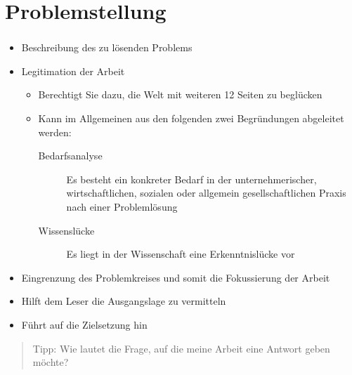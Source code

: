 \documentclass[aspectratio=169]{beamer}
\begin{document}
\section{Problemstellung}
\begin{frame}
  \frametitle{\insertsection}%
  \framesubtitle{\insertsubsection}%
  \begin{itemize}
   \item Beschreibung des zu lösenden Problems
   \item Legitimation der Arbeit
   \begin{itemize}
    \item Berechtigt Sie dazu, die Welt mit weiteren 12 Seiten zu beglücken
    \item Kann im Allgemeinen aus den folgenden zwei Begründungen abgeleitet werden:
    \begin{description}
     \item[Bedarfsanalyse] Es besteht ein konkreter Bedarf in der unternehmerischer, wirtschaftlichen, sozialen oder allgemein gesellschaftlichen Praxis nach einer Problemlösung
     \item[Wissenslücke] Es liegt in der Wissenschaft eine Erkenntnislücke vor
    \end{description}
  \end{itemize}
   \item Eingrenzung des Problemkreises und somit die Fokussierung der Arbeit
   \item Hilft dem Leser die Ausgangslage zu vermitteln
   \item Führt auf die Zielsetzung hin
  \end{itemize}
  
  \begin{quote}
   Tipp: Wie lautet die Frage, auf die meine Arbeit eine Antwort geben möchte?
  \end{quote}
\end{frame}
\end{document}
